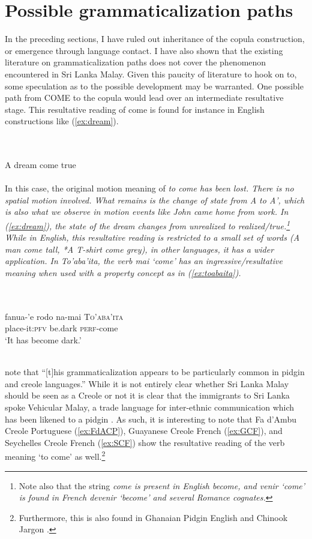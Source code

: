 \documentclass[a4paper,12pt]{article}
\newcommand{\xbox}[2]{\noindent\parbox[t]{#1}{#2}\noindent}
\newcommand{\xref}[1]{(\ref{#1})}
\newcommand{\trs}[2]{{\em #1\em} `#2'}
\newcommand{\ea}{\\\\}
\newcommand{\z}{\\\\}
\begin{document}
\section{Possible grammaticalization paths}
In the preceding sections, I have ruled out inheritance of the copula construction, or emergence through language contact. I have also shown that the existing literature on grammaticalization paths  does not cover the phenomenon encountered in Sri Lanka Malay. Given this paucity of literature to hook on to, some speculation as to the possible development may be warranted. One possible path from COME to the copula would lead over an intermediate resultative stage. This resultative reading of come is found for instance  in English constructions like \xref{ex:dream}.

\ea\label{ex:dream} A dream come true\z

In this case, the original motion meaning of \em to come \em has been lost. There is no spatial motion involved. What remains is the change of state from A to A', which is also what we observe in motion events like \em John came home from work\em. In \xref{ex:dream}, the state of the dream changes from unrealized to realized/true.\footnote{Note also that the string \em come \em is present in English \em become\em, and \trs{venir}{come} is found in French \trs{devenir}{become} and several Romance cognates.} While in English, this resultative reading is restricted to a small set of words (\em *A man come tall, *A T-shirt come grey\em), in other languages, it has a wider application. In To'aba'ita, the verb \trs{mai}{come} has an ingressive/resultative meaning when used with a property concept as in \xref{ex:toabaita}.

\xbox{\textwidth}{
\ea\label{ex:toabaita}
\gll fanua-'e rodo na-mai \textsc{To'aba'ita} \\
     place-it:\textsc{pfv} be.dark \textsc{perf}-come \\
`It has become dark.' \citep[487]{Lichtenberk1991hetero}
\z
}

\citet[74]{HeineEtAl2002} note that ``[t]his grammaticalization appears to be particularly common in pidgin and creole languages.'' While it is not entirely clear whether Sri Lanka  Malay should be seen as a Creole \citep{SmithEtAl2006cll} or not \citep{Ansaldo2008genesis,Nordhoff2009phd} it is clear that the immigrants to Sri Lanka spoke Vehicular Malay, a trade language for inter-ethnic communication which has been likened to a pidgin \citep{AdelaarEtAl1996}. As such, it is interesting to note that Fa d'Ambu Creole Portuguese \xref{ex:FdACP}, Guayanese Creole French \xref{ex:GCF}, and Seychelles Creole French \xref{ex:SCF}   show the resultative reading of the verb meaning `to come' as well.\footnote{Furthermore, this is also found in Ghanaian Pidgin English \citep{Huber1996} and Chinook Jargon \citep[236]{Grant1996}.}
\end{document}
